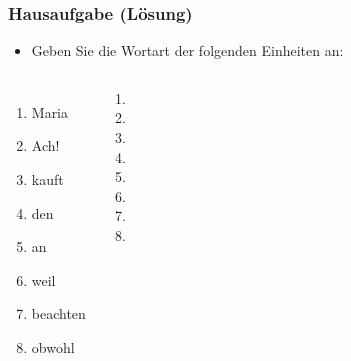 {


\begin{frame}
\frametitle{Hausaufgabe (Lösung)}

\begin{itemize}
	\item Geben Sie die Wortart der folgenden Einheiten an:
\end{itemize}

\begin{columns}
	\begin{enumerate}
		\item Maria
		\item Ach!
		\item kauft
		\item den
		\item an
		\item weil
		\item beachten
		\item obwohl
	\end{enumerate}
	

\pause
	
	\begin{enumerate}
		\item[\ras] 
		\item[\ras] 
		\item[\ras] 
		\item[\ras] 
		\item[\ras] 
		\item[\ras] 
		\item[\ras] 
		\item[\ras] 
	\end{enumerate}
\end{columns}

\end{frame}
	
} %



